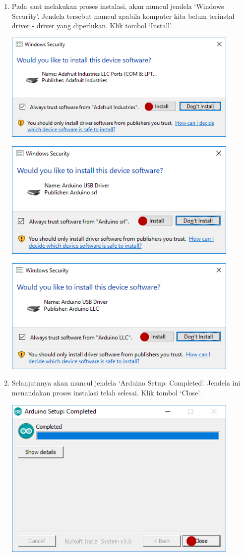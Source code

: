 \begin{itemize}
\begin{enumerate}
\item Pada saat melakukan proses instalasi, akan muncul jendela `Windows Security'. Jendela tersebut muncul apabila komputer kita belum terinstal driver - driver yang diperlukan. Klik tombol `Install'.
\break
\centerline{\includegraphics[width=0.9\textwidth]{figures/aride5.png}}
\break
\centerline{\includegraphics[width=0.9\textwidth]{figures/aride6.png}}
\break
\centerline{\includegraphics[width=0.9\textwidth]{figures/aride7.png}}
\item Selanjutnnya akan muncul jendela `Arduino Setup: Completed'. Jendela ini menandakan proses instalasi telah selesai. Klik tombol `Close'.
\break
\centerline{\includegraphics[width=0.9\textwidth]{figures/aride10.png}}

\end{enumerate}
\end{itemize}
